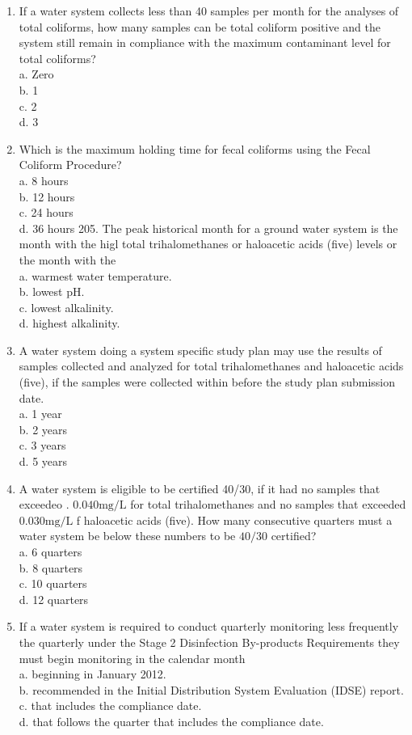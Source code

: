 \documentclass[10pt]{article}
\begin{document}
\begin{enumerate}
  \item If a water system collects less than 40 samples per month for the analyses of total coliforms, how many samples can be total coliform positive and the system still remain in compliance with the maximum contaminant level for total coliforms?\\
a. Zero\\
b. 1\\
c. 2\\
d. 3

  \item Which is the maximum holding time for fecal coliforms using the Fecal Coliform Procedure?\\
a. 8 hours\\
b. 12 hours\\
c. 24 hours\\
d. 36 hours 205. The peak historical month for a ground water system is the month with the higl total trihalomethanes or haloacetic acids (five) levels or the month with the\\
a. warmest water temperature.\\
b. lowest $\mathrm{pH}$.\\
c. lowest alkalinity.\\
d. highest alkalinity.

  \item A water system doing a system specific study plan may use the results of samples collected and analyzed for total trihalomethanes and haloacetic acids (five), if the samples were collected within before the study plan submission date.\\
a. 1 year\\
b. 2 years\\
c. 3 years\\
d. 5 years

  \item A water system is eligible to be certified 40/30, if it had no samples that exceedeo . $0.040 \mathrm{mg} / \mathrm{L}$ for total trihalomethanes and no samples that exceeded $0.030 \mathrm{mg} / \mathrm{L}$ f haloacetic acids (five). How many consecutive quarters must a water system be below these numbers to be $40 / 30$ certified?\\
a. 6 quarters\\
b. 8 quarters\\
c. 10 quarters\\
d. 12 quarters

  \item If a water system is required to conduct quarterly monitoring less frequently the quarterly under the Stage 2 Disinfection By-products Requirements they must begin monitoring in the calendar month\\
a. beginning in January 2012.\\
b. recommended in the Initial Distribution System Evaluation (IDSE) report.\\
c. that includes the compliance date.\\
d. that follows the quarter that includes the compliance date.


\end{enumerate}
\end{document}
